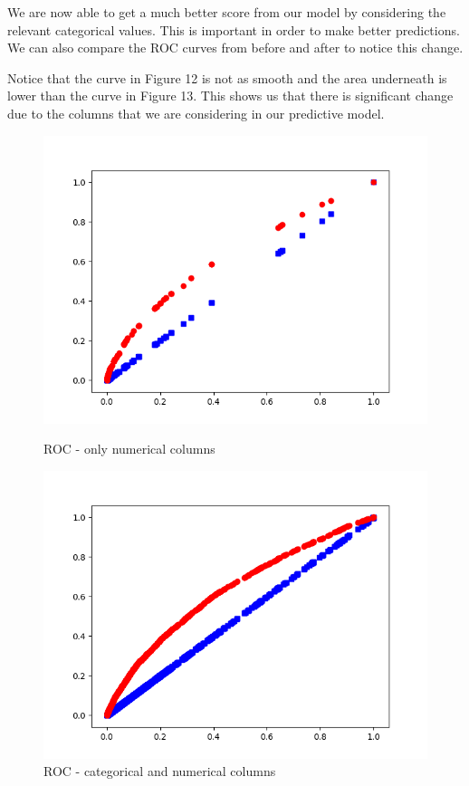 \documentclass[11pt]{report}
\newcommand{\linespace}{\vspace{0.3cm}\noindent}
\begin{document}
\noindent
We are now able to get a much better score from our model by considering the relevant categorical values. This is important in order to make better predictions. We can also compare the ROC curves from before and after to notice this change.

\linespace
Notice that the curve in Figure 12 is not as smooth and the area underneath is lower than the curve in Figure 13. This shows us that there is significant change due to the columns that we are considering in our predictive model. 
\newpage
\begin{figure}[ht]
	\begin{minipage}[b]{.5\textwidth}
	\centering
	\includegraphics[width=1\textwidth]{roc_curve.png}
	\caption{ROC - only numerical columns}
	\end{minipage}
	\hfill
	\begin{minipage}[b]{.5\textwidth}
	\centering
	\includegraphics[width=1\textwidth]{roc_mixofnumcat.png}
\caption{ROC - categorical and numerical columns}
\end{minipage}
\end{figure}
\end{document}
